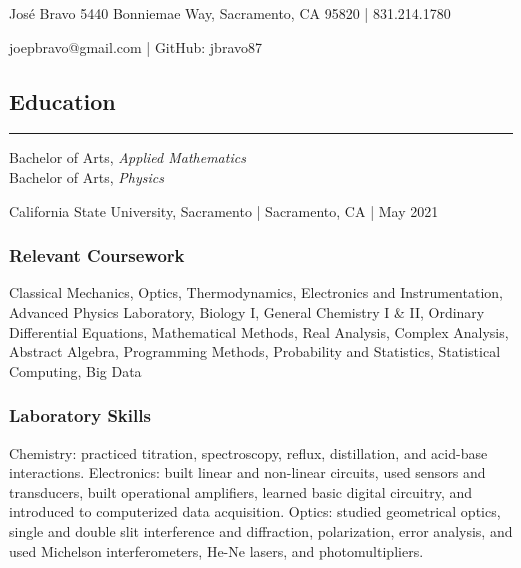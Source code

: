 \documentclass[letterpaper, 10 pt]{article}
\begin{document}
\centerline{\huge Jos\'e Bravo \hfill \normalsize 5440 Bonniemae Way, Sacramento, CA 95820 | 831.214.1780}
\hspace*{\fill} joepbravo@gmail.com | GitHub: jbravo87


\subsection*{Education}
\noindent\rule[0.75ex]{\linewidth}{0.55 pt}
Bachelor of Arts, \textit{Applied Mathematics} \\
Bachelor of Arts, \textit{Physics}

California State University, Sacramento | Sacramento, CA | May 2021 %
\subsubsection*{Relevant Coursework}
\quad Classical Mechanics, Optics, Thermodynamics, Electronics and Instrumentation, Advanced Physics Laboratory, Biology I, General Chemistry I \& II, Ordinary Differential Equations, Mathematical Methods, Real Analysis, Complex Analysis, Abstract Algebra, Programming Methods, Probability and Statistics, Statistical Computing, Big Data %

\subsubsection*{Laboratory Skills}
\quad Chemistry: practiced titration, spectroscopy, reflux, distillation, and acid-base interactions. Electronics: built linear and non-linear circuits, used sensors and transducers, built operational amplifiers, learned basic digital circuitry, and introduced to computerized data acquisition. Optics: studied geometrical optics, single and double slit interference and diffraction, polarization, error analysis, and used Michelson interferometers, He-Ne lasers, and photomultipliers.
\end{document}
